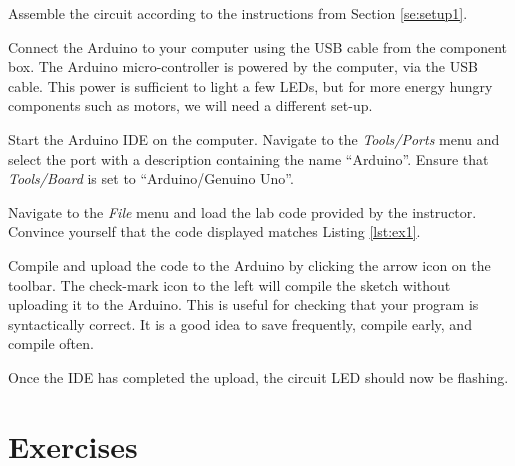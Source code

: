 \documentclass[12pt]{book}
\begin{document}
\begin{compactitem}[--]
\item Assemble the circuit according to the instructions from Section
  \ref{se:setup1}. 
\item Connect the Arduino to your computer using the USB cable from
  the component box. The Arduino micro-controller is powered by the
  computer, via the USB cable. This power is sufficient to light a few
  LEDs, but for more energy hungry components such as motors, we will
  need a different set-up.
\item Start the Arduino IDE on the computer. Navigate to the
  \emph{Tools/Ports} menu and select the port with a description
  containing the name ``Arduino''. Ensure that \emph{Tools/Board} is
  set to ``Arduino/Genuino Uno''. 
\item Navigate to the \emph{File} menu and load the lab code provided
  by the instructor. Convince yourself that the code displayed matches
  Listing \ref*{lst:ex1}.
\item  Compile and upload the code to the Arduino by clicking
the arrow icon on the toolbar.  The
check-mark icon to the left will compile the sketch
without uploading it to the Arduino. This is useful for checking that
your program is syntactically correct. It is a good idea to save frequently,
compile early, and compile often. 

\item Once the IDE has completed the upload, the circuit LED should now be flashing. 
\end{compactitem}

\section{Exercises}
\end{document}
